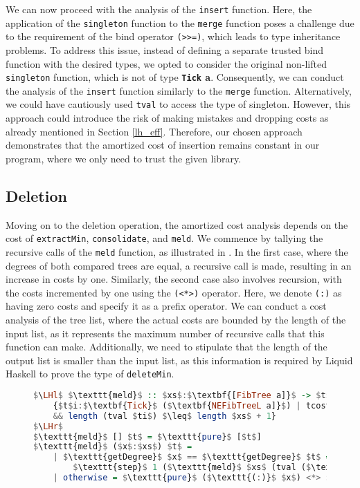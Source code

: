 \documentclass{clmthesis}
\begin{document}
We can now proceed with the analysis of the \texttt{insert} function. Here, the application of the \texttt{singleton} function to the \texttt{merge} function poses a challenge due to the requirement of the bind operator \texttt{(>>=)}, which leads to type inheritance problems. To address this issue, instead of defining a separate trusted bind function with the desired types, we opted to consider the original non-lifted \texttt{singleton} function, which is not of type \textbf{\lstinline{Tick} a}. Consequently, we can conduct the analysis of the \texttt{insert} function similarly to the \texttt{merge} function. Alternatively, we could have cautiously used \texttt{tval} to access the type of singleton. However, this approach could introduce the risk of making mistakes and dropping costs as already mentioned in Section \ref{lh_eff}. Therefore, our chosen approach demonstrates that the amortized cost of insertion remains constant in our program, where we only need to trust the given library.

\subsection{Deletion}
Moving on to the deletion operation, the amortized cost analysis depends on the cost of \texttt{extractMin}, \texttt{consolidate}, and \texttt{meld}. We commence by tallying the recursive calls of the \texttt{meld} function, as illustrated in . In the first case, where the degrees of both compared trees are equal, a recursive call is made, resulting in an increase in costs by one. Similarly, the second case also involves recursion, with the costs incremented by one using the \texttt{(<*>)} operator. Here, we denote \texttt{(:)} as having zero costs and specify it as a prefix operator. We can conduct a cost analysis of the tree list, where the actual costs are bounded by the length of the input list, as it represents the maximum number of recursive calls that this function can make. Additionally, we need to stipulate that the length of the output list is smaller than the input list, as this information is required by Liquid Haskell to prove the type of \texttt{deleteMin}.
\begin{figure}[h]
\begin{lstlisting}[mathescape=true, language=haskell, caption={Cost analysis of \texttt{meld}.},captionpos=b, label=fig:FmeldPot]
$\LHl$ $\texttt{meld}$ :: $xs$:$\textbf{[FibTree a]}$ -> $t$:$\textbf{FibTree a}$ ->
	{$t$i:$\textbf{Tick}$ ($\textbf{NEFibTreeL a]}$) | tcost $ti$ $\leq$ length $xs$ 
	&& length (tval $ti$) $\leq$ length $xs$ + 1} 
$\LHr$
$\texttt{meld}$ [] $t$ = $\texttt{pure}$ [$t$]
$\texttt{meld}$ ($x$:$xs$) $t$ = 
	| $\texttt{getDegree}$ $x$ == $\texttt{getDegree}$ $t$ =
		$\texttt{step}$ 1 ($\texttt{meld}$ $xs$ (tval ($\texttt{link}$ $t$ $x$))) 
	| otherwise = $\texttt{pure}$ ($\texttt{(:)}$ $x$) <*> $\texttt{meld}$ $xs$ $t$
\end{lstlisting}
\end{figure}
\end{document}
